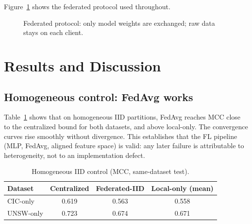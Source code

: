 \documentclass[11pt,a4paper]{article}
\begin{document}
Figure~\ref{fig:fl} shows the federated protocol used throughout.

\begin{figure}[htbp]
\centering
{}
\caption{Federated protocol: only model weights are exchanged; raw data stays on
each client.}
\label{fig:fl}
\end{figure}

\section{Results and Discussion}

\subsection{Homogeneous control: FedAvg works}
Table~\ref{tab:homo} shows that on homogeneous IID partitions, FedAvg reaches MCC
close to the centralized bound for both datasets, and above local-only. The
convergence curves rise smoothly without divergence. This establishes that the
FL pipeline (MLP, FedAvg, aligned feature space) is valid: any later failure is attributable
to heterogeneity, not to an implementation defect.

\begin{table}[htbp]
\centering\small
\caption{Homogeneous IID control (MCC, same-dataset test).}
\label{tab:homo}
\begin{tabular}{@{}lccc@{}}
\toprule
Dataset & Centralized & Federated-IID & Local-only (mean) \\
\midrule
CIC-only  & 0.619 & 0.563 & 0.558 \\
UNSW-only & 0.723 & 0.674 & 0.671 \\
\bottomrule
\end{tabular}
\end{table}
\end{document}
